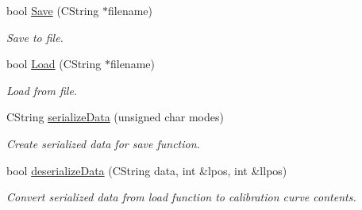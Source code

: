 \begin{Indent}{\bf }\par
{\em \label{_amgrpd41d8cd98f00b204e9800998ecf8427e}
 }\begin{DoxyCompactItemize}
\item 
bool \hyperlink{classCSpectrumData_ad92548b0354589f098e783da9ee2c615}{Save} (CString $\ast$filename)
\begin{DoxyCompactList}\small\item\em Save to file. \item\end{DoxyCompactList}\item 
bool \hyperlink{classCSpectrumData_a2cef64912d299f8a6665079c31c54e2b}{Load} (CString $\ast$filename)
\begin{DoxyCompactList}\small\item\em Load from file. \item\end{DoxyCompactList}\item 
CString \hyperlink{classCSpectrumData_ae8126ddec2ee640714c124bd91364516}{serializeData} (unsigned char modes)
\begin{DoxyCompactList}\small\item\em Create serialized data for save function. \item\end{DoxyCompactList}\item 
bool \hyperlink{classCSpectrumData_a46883fa59c6cdf7e8037a0913865bf0b}{deserializeData} (CString data, int \&lpos, int \&llpos)
\begin{DoxyCompactList}\small\item\em Convert serialized data from load function to calibration curve contents. \item\end{DoxyCompactList}\end{DoxyCompactItemize}
\end{Indent}
